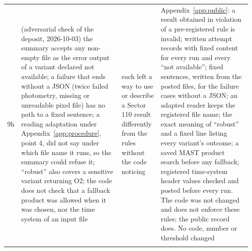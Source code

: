 \begin{longtable}{>{\raggedright\arraybackslash}p{}>{\raggedright\arraybackslash}p{}>{\raggedright\arraybackslash}p{}>{\raggedright\arraybackslash}p{}}
9h & (adversarial check of the deposit, 2026-10-03) the summary accepts any non-empty file as the error output of a variant declared not available; a failure that ends without a JSON (twice failed photometry, missing or unreadable pixel file) has no path to a fixed sentence; a reading adaptation under Appendix~\ref{app:procedure}, point 4, did not say under which file name it runs, so the summary could refuse it; ``robust'' also covers a sensitive variant returning O2; the code does not check that a fallback product was allowed when it was chosen, nor the time system of an input file & each left a way to use or describe a Sector 110 result differently from the rules without the code noticing & Appendix~\ref{app:public}: a result obtained in violation of a pre-registered rule is invalid; written attempt records with fixed content for every run and every ``not available''; fixed sentences, written from the posted files, for the failure cases without a JSON; an adapted reader keeps the registered file name; the exact meaning of ``robust'' and a fixed line listing every variant's outcome; a saved MAST product search before any fallback; registered time-system header values checked and posted before every run. The code was not changed and does not enforce these rules; the public record does. No code, number or threshold changed \\*
\bottomrule
\end{longtable}
\endgroup

